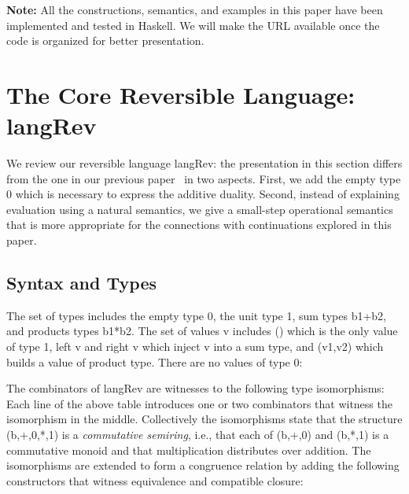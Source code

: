 \documentclass[preprint]{sigplanconf}
\begin{document}
\textbf{Note:} All the constructions, semantics, and examples in this paper
have been implemented and tested in Haskell. We will make the URL available
once the code is organized for better presentation.

\section{The Core Reversible Language: {{langRev}} }
\label{sec:pi}

We review our reversible language {{langRev}}: the presentation in this
section differs from the one in our previous paper~\cite{infeffects} in two
aspects. First, we add the empty type {{0}} which is necessary to express the
additive duality. Second, instead of explaining evaluation using a natural
semantics, we give a small-step operational semantics that is more
appropriate for the connections with continuations explored in this paper.

\subsection{Syntax and Types} 
\label{sec:pi-syntax}

The set of types includes the empty type {{0}}, the unit type {{1}}, sum
types {{b1+b2}}, and products types {{b1*b2}}. The set of values {{v}}
includes {{()}} which is the only value of type {{1}}, {{left v}} and {{right v}} 
which inject {{v}} into a sum type, and {{(v1,v2)}} which builds a
value of product type. There are no values of type {{0}}:

The combinators of {{langRev}} are witnesses to the following type
isomorphisms: 
Each line of the above table introduces one or two combinators that witness
the isomorphism in the middle. Collectively the isomorphisms state that the
structure {{(b,+,0,*,1)}} is a \emph{commutative semiring}, i.e., that each
of {{(b,+,0)}} and {{(b,*,1)}} is a commutative monoid and that
multiplication distributes over addition. The isomorphisms are extended to
form a congruence relation by adding the following constructors that witness
equivalence and compatible closure:
%
%
%
\end{document}
